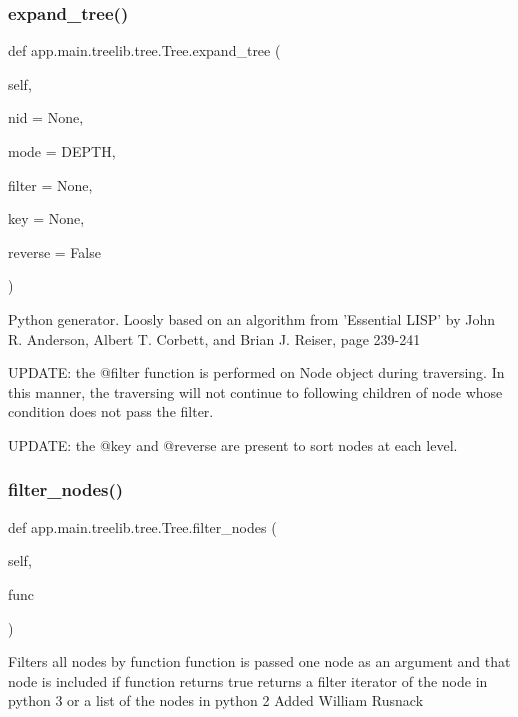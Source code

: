 \subsubsection{\texorpdfstring{expand\+\_\+tree()}{expand\_tree()}}
{\footnotesize\ttfamily def app.\+main.\+treelib.\+tree.\+Tree.\+expand\+\_\+tree (\begin{DoxyParamCaption}\item[{}]{self,  }\item[{}]{nid = {\ttfamily None},  }\item[{}]{mode = {\ttfamily DEPTH},  }\item[{}]{filter = {\ttfamily None},  }\item[{}]{key = {\ttfamily None},  }\item[{}]{reverse = {\ttfamily False} }\end{DoxyParamCaption})}

\begin{DoxyVerb}Python generator. Loosly based on an algorithm from
'Essential LISP' by John R. Anderson, Albert T. Corbett, and
Brian J. Reiser, page 239-241

UPDATE: the @filter function is performed on Node object during
traversing. In this manner, the traversing will not continue to
following children of node whose condition does not pass the filter.

UPDATE: the @key and @reverse are present to sort nodes at each
level.
\end{DoxyVerb}
 \mbox{\label{classapp_1_1main_1_1treelib_1_1tree_1_1Tree_a6c796bd0a0f6a97ddcaa4dc1808cd19e}} 
\subsubsection{\texorpdfstring{filter\+\_\+nodes()}{filter\_nodes()}}
{\footnotesize\ttfamily def app.\+main.\+treelib.\+tree.\+Tree.\+filter\+\_\+nodes (\begin{DoxyParamCaption}\item[{}]{self,  }\item[{}]{func }\end{DoxyParamCaption})}

\begin{DoxyVerb}Filters all nodes by function
function is passed one node as an argument and that node is included if function returns true
returns a filter iterator of the node in python 3 or a list of the nodes in python 2
Added William Rusnack
\end{DoxyVerb}
 \mbox{\label{classapp_1_1main_1_1treelib_1_1tree_1_1Tree_a0eab04fe3e8c044a2c8c94a1d64e7fff}} 
